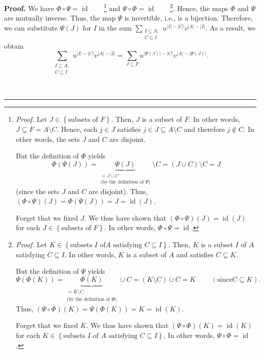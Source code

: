 \documentclass[numbers=enddot,12pt,final,onecolumn,notitlepage]{scrartcl}%
\theoremstyle{definition}
\newenvironment{proof}[1][Proof]{\noindent\textbf{#1.} }{\ \rule{0.5em}{0.5em}}
\let\sumnonlimits\sum
\renewcommand{\sum}{\sumnonlimits\limits}
\newenvironment{verlong}{}{}
\begin{document}
\begin{verlong}
\begin{proof}
We have $\Phi\circ\Psi=\operatorname*{id}$\ \ \ \ \footnote{\textit{Proof.}
Let $J\in\left\{  \text{subsets of }F\right\}  $. Then, $J$ is a subset of
$F$. In other words, $J\subseteq F=A\setminus C$. Hence, each $j\in J$
satisfies $j\in J\subseteq A\setminus C$ and therefore $j\notin C$. In other
words, the sets $J$ and $C$ are disjoint.
\par
But the definition of $\Phi$ yields
\[
\Phi\left(  \Psi\left(  J\right)  \right)  =\underbrace{\Psi\left(  J\right)
}_{\substack{=J\cup C\\\text{(by the definition of }\Psi\text{)}}}\setminus
C=\left(  J\cup C\right)  \setminus C=J
\]
(since the sets $J$ and $C$ are disjoint). Thus, $\left(  \Phi\circ
\Psi\right)  \left(  J\right)  =\Phi\left(  \Psi\left(  J\right)  \right)
=J=\operatorname*{id}\left(  J\right)  $.
\par
Forget that we fixed $J$. We thus have shown that $\left(  \Phi\circ
\Psi\right)  \left(  J\right)  =\operatorname*{id}\left(  J\right)  $ for each
$J\in\left\{  \text{subsets of }F\right\}  $. In other words, $\Phi\circ
\Psi=\operatorname*{id}$.} and $\Psi\circ\Phi=\operatorname*{id}%
$\ \ \ \ \footnote{\textit{Proof.} Let $K\in\left\{  \text{subsets }I\text{ of
}A\text{ satisfying }C\subseteq I\right\}  $. Then, $K$ is a subset $I$ of $A$
satisfying $C\subseteq I$. In other words, $K$ is a subset of $A$ and
satisfies $C\subseteq K$.
\par
But the definition of $\Psi$ yields%
\[
\Psi\left(  \Phi\left(  K\right)  \right)  =\underbrace{\Phi\left(  K\right)
}_{\substack{=K\setminus C\\\text{(by the definition of }\Phi\text{)}}}\cup
C=\left(  K\setminus C\right)  \cup C=K\ \ \ \ \ \ \ \ \ \ \left(  \text{since
}C\subseteq K\right)  .
\]
Thus, $\left(  \Psi\circ\Phi\right)  \left(  K\right)  =\Psi\left(
\Phi\left(  K\right)  \right)  =K=\operatorname*{id}\left(  K\right)  $.
\par
Forget that we fixed $K$. We thus have shown that $\left(  \Psi\circ
\Phi\right)  \left(  K\right)  =\operatorname*{id}\left(  K\right)  $ for each
$K\in\left\{  \text{subsets }I\text{ of }A\text{ satisfying }C\subseteq
I\right\}  $. In other words, $\Psi\circ\Phi=\operatorname*{id}$.}. Hence, the
maps $\Phi$ and $\Psi$ are mutually inverse. Thus, the map $\Psi$ is
invertible, i.e., is a bijection. Therefore, we can substitute $\Psi\left(
J\right)  $ for $I$ in the sum $\sum_{\substack{I\subseteq A;\\C\subseteq
I}}u^{\left\vert I\right\vert -\left\vert C\right\vert }v^{\left\vert
A\right\vert -\left\vert I\right\vert }$. As a result, we obtain%
\begin{equation}
\sum_{\substack{I\subseteq A;\\C\subseteq I}}u^{\left\vert I\right\vert
-\left\vert C\right\vert }v^{\left\vert A\right\vert -\left\vert I\right\vert
}=\sum_{J\subseteq F}u^{\left\vert \Psi\left(  J\right)  \right\vert
-\left\vert C\right\vert }v^{\left\vert A\right\vert -\left\vert \Psi\left(
J\right)  \right\vert }. \label{pf.lem.set-sandwich-sum.1}%
\end{equation}



\end{proof}
\end{verlong}
\end{document}
